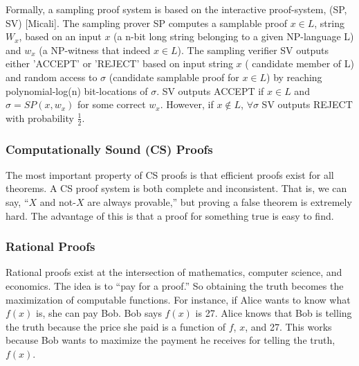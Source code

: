 \documentclass[twoside]{article}
\renewcommand{\cite}[1]{[#1]}
\begin{document}
Formally, a sampling proof system is based on the interactive proof-system, (SP, SV) \cite{Micali}. The sampling prover SP computes a samplable proof $x \in L$, string $W_x$, based on an input $x$ (a n-bit long string belonging to a given NP-language L) and $w_x$ (a NP-witness that indeed $x\in L$). The  sampling verifier SV outputs either 'ACCEPT' or 'REJECT' based on input string $x$ ( candidate member of L) and  random access to $\sigma$ (candidate samplable proof for $x \in L$) by reaching polynomial-log(n) bit-locations of $\sigma$.
SV outputs ACCEPT if $x\in L$ and $\sigma = SP(x,w_x)$ for some  correct $w_x$. However, if $x \notin L$, $\forall \sigma$ SV outputs REJECT with probability $\frac{1}{2}$.

\subsubsection{Computationally Sound (CS) Proofs}
The most important property of CS proofs is that efficient proofs exist for all theorems. 
A CS proof system is both complete and inconsistent. 
That is, we can say,  ``$X$ and not-$X$ are always provable,'' but proving a false theorem is extremely hard.
The advantage of this is that a proof for something true is easy to find. 

\subsubsection{Rational Proofs}
Rational proofs exist at the intersection of mathematics, computer science, and economics. 
The idea is to ``pay for a proof.''
So obtaining the truth becomes the maximization of computable functions. 
For instance, if Alice wants to know what $f(x)$ is, she can pay Bob. Bob says $f(x)$ is 27. Alice knows that Bob is telling the truth because the price she paid is a function of $f$, $x$, and 27. This works because Bob wants to maximize the payment he receives for telling the truth, $f(x)$.







\end{document}
